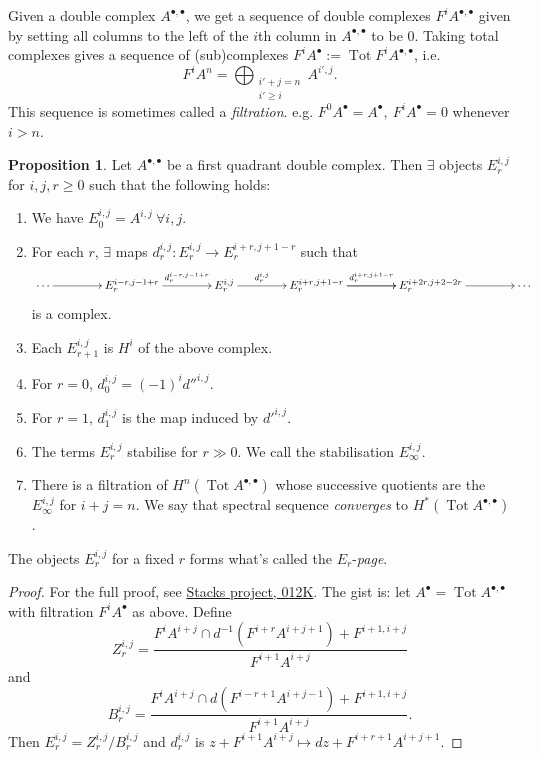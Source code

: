 \documentclass{article}
\newcommand{\Tot}{\operatorname{Tot}}
\theoremstyle{definition}
\newtheorem{prop}[defn]{Proposition}
\begin{document}
Given a double complex $A^{\bullet,\bullet}$, we get a sequence of double complexes $F^iA^{\bullet,\bullet}$ given by setting all columns to the left of the $i$th column in $A^{\bullet,\bullet}$ to be 0. Taking total complexes gives a sequence of (sub)complexes $F^iA^\bullet:=\Tot F^iA^{\bullet,\bullet}$, i.e.
\[
F^iA^n=\bigoplus_{\substack{i'+j=n\\ i'\geq i}}A^{i',j}.
\]
This sequence is sometimes called a \textit{filtration}. e.g. $F^0A^\bullet=A^\bullet,\ F^iA^\bullet=0$ whenever $i>n$.

\begin{prop}
Let $A^{\bullet,\bullet}$ be a first quadrant double complex. Then $\exists$ objects $E^{i,j}_r$ for $i,j,r\geq 0$ such that the following holds:
\begin{enumerate}
\item We have $E^{i,j}_0=A^{i,j} \ \forall i,j$.
\item For each $r$, $\exists$ maps $d_r^{i,j}:E_r^{i,j}\rightarrow E_r^{i+r,j+1-r}$ such that 
\[
\xymatrix@C=3.5pc{
\cdots\ar[r] & E_r^{i-r,j-1+r}\ar[r]^-{d_r^{i-r,j-1+r}} & E_r^{i,j}\ar[r]^-{d_r^{i,j}} & E_r^{i+r,j+1-r}\ar[r]^-{d_r^{i+r,j+1-r}}\ar[r] & E_r^{i+2r,j+2-2r}\ar[r] & \cdots
}
\]
is a complex.
\item Each $E_{r+1}^{i,j}$ is $H^i$ of the above complex.
\item For $r=0$, $d_0^{i,j}=(-1)^id''^{i,j}$.
\item For $r=1$, $d_1^{i,j}$ is the map induced by $d'^{i,j}$.
\item The terms $E_r^{i,j}$ stabilise for $r\gg 0$. We call the stabilisation $E_\infty^{i,j}$.
\item There is a filtration of $H^n(\Tot A^{\bullet,\bullet})$ whose successive quotients are the $E_\infty^{i,j}$ for $i+j=n$. We say that spectral sequence \textit{converges} to $H^\ast(\Tot A^{\bullet,\bullet})$.
\end{enumerate}
The objects $E_r^{i,j}$ for a fixed $r$ forms what's called the $E_r$-\textit{page}.
\end{prop}
\begin{proof}
For the full proof, see \href{https://stacks.math.columbia.edu/tag/012K}{Stacks project, 012K}. The gist is: let $A^\bullet=\Tot A^{\bullet,\bullet}$ with filtration $F^iA^\bullet$ as above. Define
\[
Z_r^{i,j}=\frac{F^iA^{i+j}\cap d^{-1}\left(F^{i+r}A^{i+j+1}\right)+F^{i+1,i+j}}{F^{i+1}A^{i+j}}
\]
and
\[
B_r^{i,j}=\frac{F^iA^{i+j}\cap d\left(F^{i-r+1}A^{i+j-1}\right)+F^{i+1,i+j}}{F^{i+1}A^{i+j}}.
\]
Then $E_r^{i,j}=Z_r^{i,j}/B_r^{i,j}$ and $d_r^{i,j}$ is $z+F^{i+1}A^{i+j}\mapsto dz+F^{i+r+1}A^{i+j+1}$.
\end{proof}
\end{document}
